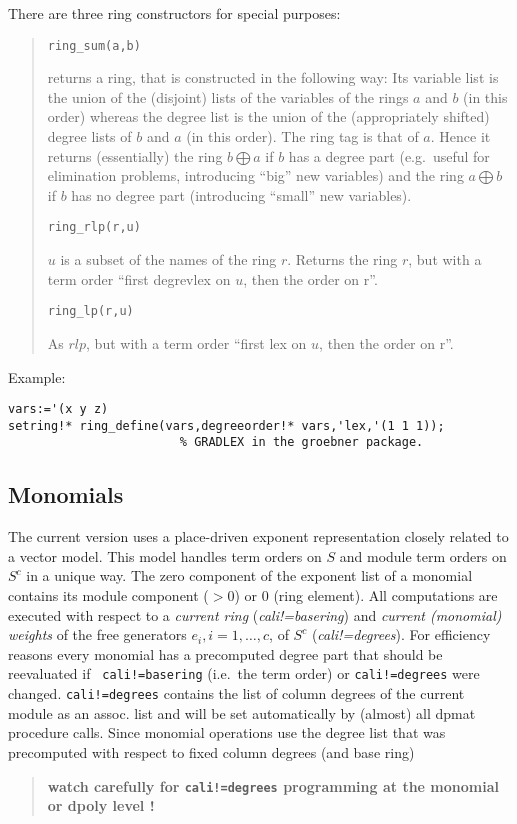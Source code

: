 \documentclass[a4paper,11pt]{article}
\newcommand{\ind}[1]{{\em #1}\index{#1}}
\newcommand{\pbx}[1]{\mbox{}\hfill \parbox[t]{12cm}{#1} \pagebreak[3]}
\begin{document}
There are three ring constructors for special purposes:
\begin{quote}
\verb|ring_sum(a,b)|

\pbx{returns a ring, that is constructed in the following way: Its
variable list is the union of the (disjoint) lists of the variables
of the rings $a$ and $b$ (in this order) whereas the degree list is
the union of the (appropriately shifted) degree lists of $b$ and $a$
(in this order). The ring tag is that of $a$. Hence it returns
(essentially) the ring $b\bigoplus a$ if $b$ has a degree part (e.g.\
useful for elimination problems, introducing ``big'' new variables) 
and the ring $a\bigoplus b$ if $b$ has no degree part (introducing 
``small'' new variables).}

\verb|ring_rlp(r,u)|

\pbx{$u$ is a subset of the names of the ring $r$. Returns the ring
$r$, but with a term order ``first degrevlex on $u$, then the order on
r''.} 

\verb|ring_lp(r,u)|

\pbx{As $rlp$, but with a term order ``first lex on $u$, then the
order on r''.}  
\end{quote}

\noindent Example:
\begin{verbatim}
vars:='(x y z)
setring!* ring_define(vars,degreeorder!* vars,'lex,'(1 1 1));   
                        % GRADLEX in the groebner package.
\end{verbatim}

\subsection{Monomials}

The current version uses a place-driven exponent representation
closely related to a vector model. This model handles term orders  on $S$
and module term orders on $S^c$ in a unique way. The zero component of the
exponent list of a monomial contains its module component ($>0$) or 0
(ring element). All computations are executed with respect to a
{\em current ring} (\ind{cali!=basering}) and {\em current (monomial)
weights} of the free generators $e_i, i=1,\ldots,c$, of $S^c$ 
(\ind{cali!=degrees}). For efficiency reasons every monomial has a
precomputed degree part that should be reevaluated if {\tt
cali!=basering} (i.e.\ the term order) or {\tt cali!=degrees} were
changed. {\tt cali!=degrees} contains the list of column degrees of
the current module as an assoc. list and will be set automatically by
(almost) all dpmat procedure calls. Since monomial operations use the
degree list that was precomputed with respect to fixed column degrees
(and base ring) 
\begin{quote}\bf
watch carefully for {\tt cali!=degrees} programming at the monomial 
or dpoly level !
\end{quote}
\end{document}

